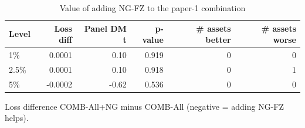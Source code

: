\begin{table}[htbp]
\centering
\footnotesize
\caption{Value of adding NG-FZ to the paper-1 combination}
\label{tab:combo_ng}
\begin{tabular}{lrrrrr}
\toprule
Level & Loss diff & Panel DM t & p-value & \# assets better & \# assets worse \\
\midrule
1\% & 0.0001 & 0.10 & 0.919 & 0 & 0 \\
2.5\% & 0.0001 & 0.10 & 0.918 & 0 & 1 \\
5\% & -0.0002 & -0.62 & 0.536 & 0 & 0 \\
\bottomrule
\end{tabular}
\par\smallskip\parbox{\linewidth}{\scriptsize Loss difference COMB-All+NG minus COMB-All (negative = adding NG-FZ helps).}
\end{table}